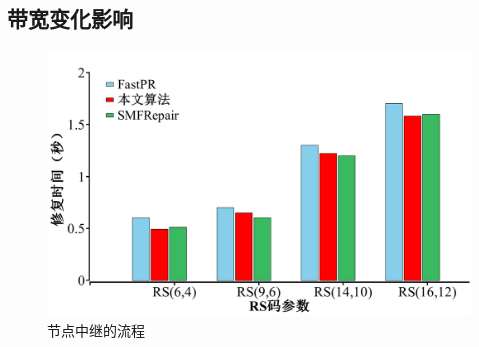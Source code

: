 \subsection{带宽变化影响}


\begin{figure}[htbp]
	\centering
	\includegraphics [scale=0.25]{figures/3-19.pdf}
	\caption{节点中继的流程}
	\label{fig:3-19}
\end{figure}